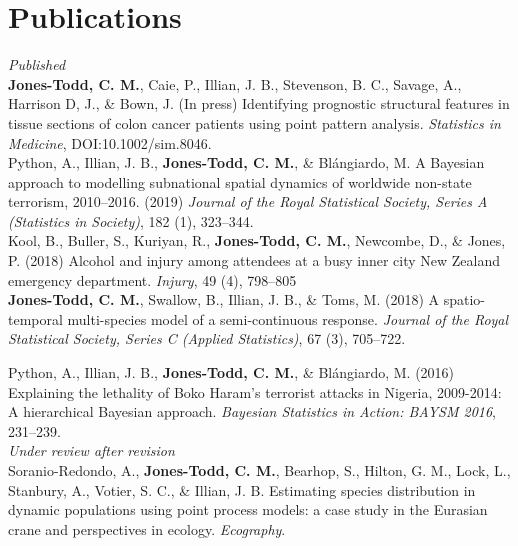 \documentclass[10pt,a4paper]{moderncv}
\begin{document}
  \section{Publications}
  \vspace{5pt}

  \textit{\small{Published}}\\
  
\vspace{-3pt}
\textbf{Jones-Todd, C. M.}, Caie, P., Illian, J. B., Stevenson, B. C., Savage, A., Harrison D, J., \& Bown, J. (In press) Identifying prognostic structural features in tissue sections of colon cancer patients using point pattern analysis. \textit{Statistics in Medicine}, DOI:10.1002/sim.8046.\\

\vspace{-3pt}
Python, A.,  Illian, J. B., \textbf{Jones-Todd, C. M.}, \& Bl\'{a}ngiardo, M. A Bayesian approach to modelling subnational spatial dynamics of worldwide non-state terrorism, 2010--2016. (2019) \textit{Journal of the Royal Statistical Society, Series  A (Statistics in Society)}, 182 (1), 323--344.\\

\vspace{-3pt}
Kool, B., Buller, S., Kuriyan, R., \textbf{Jones-Todd, C. M.}, Newcombe, D., \& Jones, P. (2018) Alcohol and injury among attendees at a busy inner city New Zealand emergency department. \textit{Injury}, 49 (4), 798--805\\


  \textbf{Jones-Todd, C. M.}, Swallow, B., Illian, J. B., \& Toms, M. (2018) A spatio-temporal multi-species model of a semi-continuous response. \textit{Journal of the Royal Statistical Society, Series C (Applied Statistics)}, 67 (3), 705--722.\\
\vspace{5pt}

\vspace{-3pt}
Python, A.,  Illian, J. B., \textbf{Jones-Todd, C. M.}, \& Bl\'{a}ngiardo, M. (2016) Explaining the lethality of Boko Haram’s terrorist attacks in Nigeria, 2009-2014: A hierarchical Bayesian approach. \textit{Bayesian Statistics in Action: BAYSM 2016}, 231--239.\\


\textit{\small{Under review after revision}}\\

\vspace{-3pt}
Soranio-Redondo, A., \textbf{Jones-Todd, C. M.}, Bearhop, S., Hilton, G. M., Lock, L., Stanbury, A., Votier, S. C., \& Illian, J. B. Estimating species distribution in dynamic populations using point process models: a case study in the Eurasian crane and perspectives in ecology. \textit{Ecography}.\\
\end{document}
